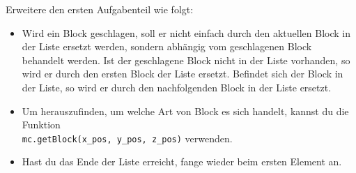 Erweitere den ersten Aufgabenteil wie folgt:
\begin{itemize}
	\item Wird ein Block geschlagen, soll er nicht einfach durch den aktuellen Block in der Liste ersetzt werden, sondern abhängig vom geschlagenen Block behandelt werden. Ist der geschlagene Block nicht in der Liste vorhanden, so wird er durch den ersten Block der Liste ersetzt. Befindet sich der Block in der Liste, so wird er durch den nachfolgenden Block in der Liste ersetzt.
	
	\item Um herauszufinden, um welche Art von Block es sich handelt, kannst du die Funktion\\ \texttt{mc.getBlock(x\_pos, y\_pos, z\_pos)} verwenden.
	
	\item Hast du das Ende der Liste erreicht, fange wieder beim ersten Element an.
\end{itemize}